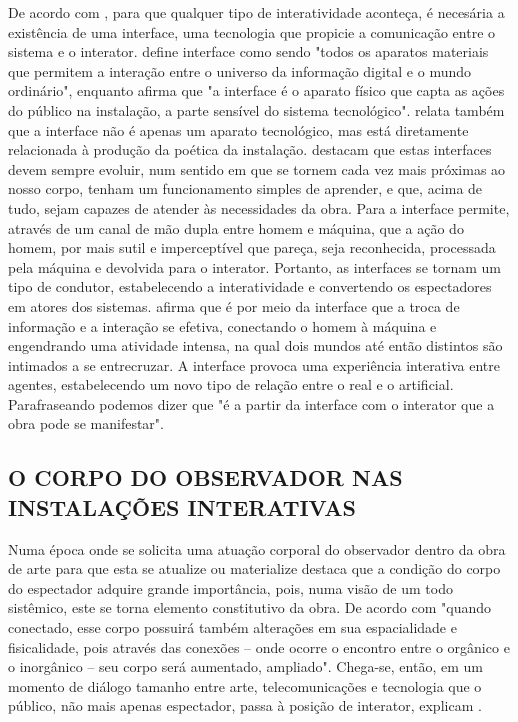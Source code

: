De acordo com , para que qualquer tipo de interatividade aconteça, é necesária a existência de uma interface, uma tecnologia que propicie a comunicação entre o sistema e o interator.  define interface como sendo "todos os aparatos materiais que permitem a interação entre o universo da informação digital e o mundo ordinário", enquanto  afirma que "a interface é o aparato físico que capta as ações do público na instalação, a parte sensível do sistema tecnológico".  relata também que a interface não é apenas um aparato tecnológico, mas está diretamente relacionada à produção da poética da instalação.   destacam que estas interfaces devem sempre evoluir, num sentido em que se tornem cada vez mais próximas ao nosso corpo, tenham um funcionamento simples de aprender, e que, acima de tudo, sejam capazes de atender às necessidades da obra. Para  a interface permite, através de um canal de mão dupla entre homem e máquina, que a ação do homem, por mais sutil e imperceptível que pareça, seja reconhecida, processada pela máquina e devolvida para o interator. Portanto, as interfaces se tornam um tipo de condutor, estabelecendo a interatividade e convertendo os espectadores em atores dos sistemas.  afirma que é por meio da interface que a troca de informação e a interação se efetiva, conectando o homem à máquina e engendrando uma atividade intensa, na qual dois mundos até então distintos são intimados a se entrecruzar. A interface provoca uma experiência interativa entre agentes, estabelecendo um novo tipo de relação entre o real e o artificial. Parafraseando  podemos dizer que "é a partir da interface com o interator que a obra pode se manifestar". 


\subsection{O CORPO DO OBSERVADOR NAS INSTALAÇÕES INTERATIVAS}
	
Numa época onde se solicita uma atuação corporal do observador dentro da obra de arte para que esta se atualize ou materialize  destaca que a condição do corpo do espectador adquire grande importância, pois, numa visão de um todo sistêmico, este se torna elemento constitutivo da obra. De acordo com  "quando conectado, esse corpo possuirá também alterações em sua espacialidade e fisicalidade, pois através das conexões – onde ocorre o encontro entre o orgânico e o inorgânico – seu corpo será aumentado, ampliado". Chega-se, então, em um momento de diálogo tamanho entre arte, telecomunicações e tecnologia que o público, não mais apenas espectador, passa à posição de interator, explicam . 

